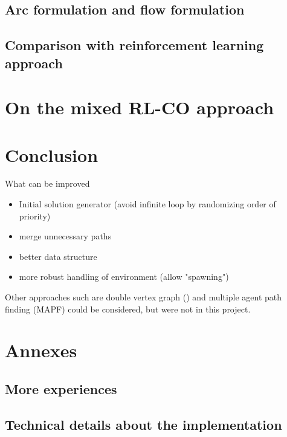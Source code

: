 \documentclass[14pt,a4paper]{article}
\theoremstyle{definition}
\numberwithin{equation}{subsection}
\begin{document}
\subsection{Arc formulation and flow formulation}
\label{results:arcsVSflow}


\subsection{Comparison with reinforcement learning approach}


\newpage
\section{On the mixed RL-CO approach}




\newpage

\section{Conclusion}
What can be improved
\begin{itemize}
	\item Initial solution generator (avoid infinite loop by randomizing order of priority)
	\item merge unnecessary paths
	\item better data structure 
	\item more robust handling of environment (allow "spawning")
\end{itemize}


Other approaches such are double vertex graph (\cite{BachelorThesis}) and multiple agent path finding (MAPF) could be considered, but were not in this project.





\newpage
\section{Annexes}
\subsection{More experiences}
\subsection{Technical details about the implementation}


\newpage

 \nocite{*} 




\end{document}
